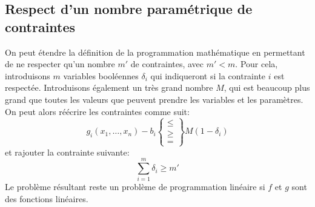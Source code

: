 \documentclass[a4paper]{article}
\begin{document}
\subsection{Respect d'un nombre paramétrique de contraintes}
On peut étendre la définition de la programmation mathématique en permettant
de ne respecter qu'un nombre \(m'\) de contraintes, avec \(m'<m\).
Pour cela, introduisons \(m\) variables booléennes \(\delta_i\) qui indiqueront
si la contrainte \(i\) est respectée. Introduisons également un très grand nombre \(M\),
qui est beaucoup plus grand que toutes les valeurs que peuvent prendre les variables
et les paramètres. On peut alors réécrire les contraintes comme suit:
\[g_i(x_1,\dots,x_n)-b_i\begin{Bmatrix}\le\\\ge\\=\end{Bmatrix}M(1-\delta_i)\]
et rajouter la contrainte suivante:
\[\sum_{i=1}^{m}\delta_i\ge m'\]
Le problème résultant reste un problème de programmation linéaire si \(f\) et
\(g\) sont des fonctions linéaires.
\end{document}
